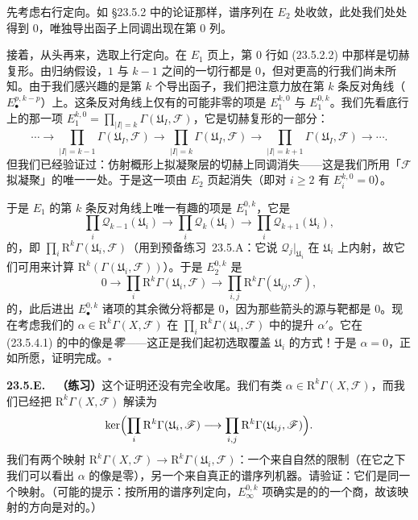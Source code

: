 先考虑右行定向。如 \S23.5.2 中的论证那样，谱序列在 $E_2$ 处收敛，此处我们处处得到 $0$，唯独导出函子上同调出现在第 $0$ 列。

接着，从头再来，选取上行定向。在 $E_1$ 页上，第 $0$ 行如 (23.5.2.2) 中那样是切赫复形。由归纳假设，$1$ 与 $k-1$ 之间的一切行都是 $0$，但对更高的行我们尚未所知。由于我们感兴趣的是第 $k$ 个导出函子，我们把注意力放在第 $k$ 条反对角线（$E_\bullet^{p,k-p}$）上。这条反对角线上仅有的可能非零的项是 $E_1^{k,0}$ 与 $E_1^{0,k}$。我们先看底行上的那一项 $E_1^{k,0}=\prod_{|I|=k}\Gamma(\mathfrak{U}_I,\mathscr{F})$，它是切赫复形的一部分：
\[
\cdots \longrightarrow \prod_{|I|=k-1}\Gamma(\mathfrak{U}_I,\mathscr{F}) \longrightarrow \prod_{|I|=k}\Gamma(\mathfrak{U}_I,\mathscr{F}) \longrightarrow \prod_{|I|=k+1}\Gamma(\mathfrak{U}_I,\mathscr{F}) \longrightarrow \cdots.
\]
但我们已经验证过：仿射概形上拟凝聚层的切赫上同调消失——这是我们所用「$\mathscr{F}$ 拟凝聚」的唯一一处。于是这一项由 $E_2$ 页起消失（即对 $i\ge 2$ 有 $E_i^{k,0}=0$）。

于是 $E_1$ 的第 $k$ 条反对角线上唯一有趣的项是 $E_1^{0,k}$，它是
\begin{equation*}\tag{23.5.4.1}\label{eq:agree-antidiag}
\prod_i\mathscr{Q}_{k-1}(\mathfrak{U}_i) \longrightarrow \prod_i\mathscr{Q}_k(\mathfrak{U}_i) \longrightarrow \prod_i\mathscr{Q}_{k+1}(\mathfrak{U}_i),
\end{equation*}
的\trHomology，即 $\prod_i\mathrm{R}^k\Gamma(\mathfrak{U}_i,\mathscr{F})$（用到\mbox{预备练习~23.5.A}：它说 $\mathscr{Q}_j|_{\mathfrak{U}_i}$ 在 $\mathfrak{U}_i$ 上内射，故它们可用来计算 $\mathrm{R}^k(\Gamma(\mathfrak{U}_i,\mathscr{F}))$）。于是 $E_2^{0,k}$ 是
\[
0 \longrightarrow \prod_i\mathrm{R}^k\Gamma(\mathfrak{U}_i,\mathscr{F}) \longrightarrow \prod_{i,j}\mathrm{R}^k\Gamma(\mathfrak{U}_{ij},\mathscr{F}),
\]
的\trHomology，此后进出 $E_\bullet^{0,k}$ 诸项的其余微分将都是 $0$，因为那些箭头的源与靶都是 $0$。现在考虑我们的 $\alpha\in\mathrm{R}^k\Gamma(X,\mathscr{F})$ 在 $\prod_i\mathrm{R}^k\Gamma(\mathfrak{U}_i,\mathscr{F})$ 中的提升 $\alpha'$。它在 (23.5.4.1) 的\trHomology{}中的像是\emph{零}——这正是我们起初选取覆盖 $\mathfrak{U}_i$ 的方式！于是 $\alpha=0$，正如所愿，证明完成。\hfill$\square$

\textbf{23.5.E.}\ \extrahard\ \textbf{（练习）}\quad 这个证明还没有完全收尾。我们有类 $\alpha\in\mathrm{R}^k\Gamma(X,\mathscr{F})$，而我们已经把 $\mathrm{R}^k\Gamma(X,\mathscr{F})$ 解读为
\[
\ker\Bigl(\prod_i\mathrm{R}^k\Gamma(\mathfrak{U}_i,\mathscr{F}) \longrightarrow \prod_{i,j}\mathrm{R}^k\Gamma(\mathfrak{U}_{ij},\mathscr{F})\Bigr).
\]
我们有两个映射 $\mathrm{R}^k\Gamma(X,\mathscr{F})\to\mathrm{R}^k\Gamma(\mathfrak{U}_i,\mathscr{F})$：一个来自自然的限制（在它之下我们可以看出 $\alpha$ 的像是零），另一个来自真正的谱序列机器。请验证：它们是同一个映射。（可能的提示：按所用的谱序列定向，$E_\infty^{0,k}$ 项确实是\trDoubleComplex{}的\trHomology{}的一个商，故该映射的方向是对的。）

